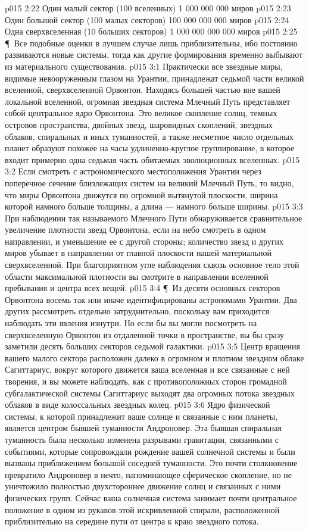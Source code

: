 \vs p015 2:22 Один малый сектор (100 вселенных) 1 000 000 000 миров
\vs p015 2:23 Один большой сектор (100 малых секторов) 100 000 000 000 миров
\vs p015 2:24 Одна сверхвселенная (10 больших секторов) 1 000 000 000 000 миров
\vs p015 2:25 \P\ Все подобные оценки в лучшем случае лишь приблизительны, ибо постоянно развиваются новые системы, тогда как другие формирования временно выбывают из материального существования.
\vs p015 3:1 Практически все звездные миры, видимые невооруженным глазом на Урантии, принадлежат седьмой части великой вселенной, сверхвселенной Орвонтон. Находясь большей частью вне вашей локальной вселенной, огромная звездная система Млечный Путь представляет собой центральное ядро Орвонтона. Это великое скопление солнц, темных островов пространства, двойных звезд, шаровидных скоплений, звездных облаков, спиральных и иных туманностей, а также несметное число отдельных планет образуют похожее на часы удлиненно\hyp{}круглое группирование, в которое входит примерно одна седьмая часть обитаемых эволюционных вселенных.
\vs p015 3:2 Если смотреть с астрономического местоположения Урантии через поперечное сечение близлежащих систем на великий Млечный Путь, то видно, что миры Орвонтона движутся по огромной вытянутой плоскости, ширина которой намного больше толщины, а длина --- намного больше ширины.
\vs p015 3:3 При наблюдении так называемого Млечного Пути обнаруживается сравнительное увеличение плотности звезд Орвонтона, если на небо смотреть в одном направлении, и уменьшение ее с другой стороны; количество звезд и других миров убывает в направлении от главной плоскости нашей материальной сверхвселенной. При благоприятном угле наблюдения сквозь основное тело этой области максимальной плотности вы смотрите в направлении вселенной пребывания и центра всех вещей.
\vs p015 3:4 \P\ Из десяти основных секторов Орвонтона восемь так или иначе идентифицированы астрономами Урантии. Два других рассмотреть отдельно затруднительно, поскольку вам приходится наблюдать эти явления изнутри. Но если бы вы могли посмотреть на сверхвселенную Орвонтон из отдаленной точки в пространстве, вы бы сразу заметили десять больших секторов седьмой галактики.
\vs p015 3:5 Центр вращения вашего малого сектора расположен далеко в огромном и плотном звездном облаке Сагиттариус, вокруг которого движется ваша вселенная и все связанные с ней творения, и вы можете наблюдать, как с противоположных сторон громадной субгалактической системы Сагиттариус выходят два огромных потока звездных облаков в виде колоссальных звездных колец.
\vs p015 3:6 Ядро физической системы, к которой принадлежит ваше солнце и связанные с ним планеты, является центром бывшей туманности Андроновер. Эта бывшая спиральная туманность была несколько изменена разрывами гравитации, связанными с событиями, которые сопровождали рождение вашей солнечной системы и были вызваны приближением большой соседней туманности. Это почти столкновение превратило Андроновер в нечто, напоминающее сферическое скопление, но не уничтожило полностью двухстороннее движение солнц и связанных с ними физических групп. Сейчас ваша солнечная система занимает почти центральное положение в одном из рукавов этой искривленной спирали, расположенной приблизительно на середине пути от центра к краю звездного потока.
